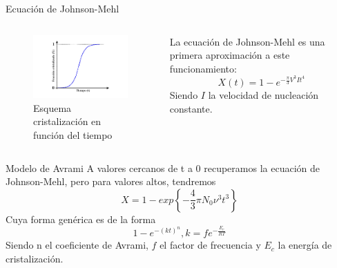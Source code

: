 \documentclass[11pt]{beamer}
\begin{document}
		\begin{frame}{Ecuación de Johnson-Mehl}
			\begin{columns}[T]	
				\begin{column}{.49\textwidth}
					\begin{figure}
						\includegraphics[scale=0.5]{img/cristalization_vs_tiempo.png}
						\caption*{Esquema cristalización en función del tiempo}
					\end{figure}
				\end{column}
				\begin{column}{.49\textwidth}
				La ecuación de Johnson-Mehl es una primera aproximación a este funcionamiento:
				\begin{equation}
					X(t)=1-e^{-\frac{\pi}{3}V^3 I t^4}
				\end{equation}
					Siendo $I$ la velocidad de nucleación constante.
				\end{column}
			\end{columns}
		\end{frame}
		\begin{frame}{Modelo de Avrami}
			A valores cercanos de t a 0 recuperamos la ecuación de Johnson-Mehl, pero para valores altos, tendremos
			\begin{equation*}
				X = 1 - exp\left\lbrace -\frac{4}{3} \pi N_0 \nu^3 t^3 \right\rbrace
			\end{equation*}		 
			Cuya forma genérica es de la forma 
			\begin{equation*}
				1 - e^{-(kt)^n}, k=fe^{-\frac{E_c}{RT}}
			\end{equation*} 
			Siendo n el coeficiente de Avrami, $f$ el factor de frecuencia y $E_c$ la energía de cristalización.
		\end{frame}
		
\end{document}
